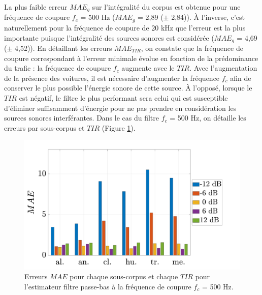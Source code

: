 La plus faible erreur $MAE_g$ sur l'intégralité du corpus est obtenue pour une fréquence de coupure $f_c$ = 500 Hz ($MAE_g$ = 2,89 ($\pm$ 2,84)).
\`A l'inverse, c'est naturellement pour la fréquence de coupure de 20 kHz que l'erreur est la plus importante puisque l'intégralité des sources sonores est considérée ($MAE_g$ = 4,69 ($\pm$ 4,52)).
En détaillant les erreurs $MAE_{TIR}$, on constate que la fréquence de coupure correspondant à l'erreur minimale évolue en fonction de la prédominance du trafic : la fréquence de coupure $f_c$ augmente avec le $TIR$.
Avec l'augmentation de la présence des voitures, il est nécessaire d'augmenter la fréquence $f_c$ afin de conserver le plus possible l'énergie sonore de cette source. \`A l'opposé, lorsque le $TIR$ est négatif, le filtre le plus performant sera celui qui est susceptible d'éliminer suffisamment d'énergie pour ne pas prendre en considération les sources sonores interférantes.
Dans le cas du filtre $f_c$ = 500 Hz,  on détaille les erreurs par sous-corpus et $TIR$ (Figure \ref{fig:filtre_amb_tir}).


\begin{figure}[h!]
\centering
\includegraphics[width=0.7\linewidth]{./figures/resultats/amb_filtre_500_bar.pdf}
\caption{Erreurs $MAE$ pour chaque sous-corpus et chaque $TIR$ pour l'estimateur filtre passe-bas à la fréquence de coupure $f_c$ = 500 Hz.}
\label{fig:filtre_amb_tir}
\end{figure}


